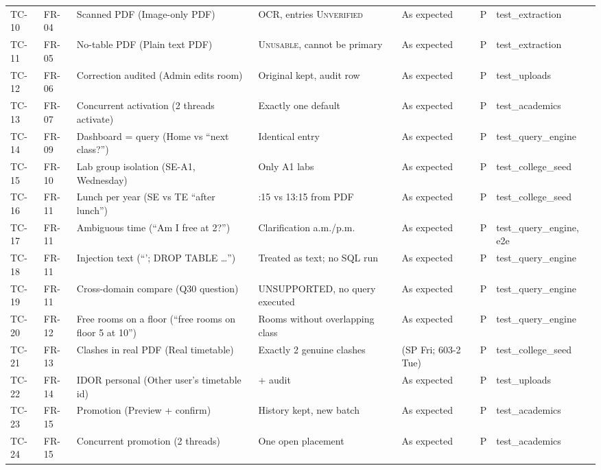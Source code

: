 \begin{longtable}{@{}p{1.15cm}p{1.2cm}>{\raggedright\arraybackslash}p{4.4cm}>{\raggedright\arraybackslash}p{3.6cm}>{\raggedright\arraybackslash}p{2.1cm}p{0.6cm}>{\raggedright\arraybackslash}p{2.3cm}@{}}
TC-10 & FR-04 & Scanned PDF (Image-only PDF) & OCR, entries \textsc{Unverified} & As expected & P & test\_\allowbreak{}extraction\\
TC-11 & FR-05 & No-table PDF (Plain text PDF) & \textsc{Unusable}, cannot be primary & As expected & P & test\_\allowbreak{}extraction\\
TC-12 & FR-06 & Correction audited (Admin edits room) & Original kept, audit row & As expected & P & test\_\allowbreak{}uploads\\
TC-13 & FR-07 & Concurrent activation (2 threads activate) & Exactly one default & As expected & P & test\_\allowbreak{}academics\\
TC-14 & FR-09 & Dashboard = query (Home vs ``next class?'') & Identical entry & As expected & P & test\_\allowbreak{}query\_\allowbreak{}engine\\
TC-15 & FR-10 & Lab group isolation (SE-A1, Wednesday) & Only A1 labs & As expected & P & test\_\allowbreak{}college\_\allowbreak{}seed\\
TC-16 & FR-11 & Lunch per year (SE vs TE ``after lunch'') & 14:15 vs 13:15 from PDF & As expected & P & test\_\allowbreak{}college\_\allowbreak{}seed\\
TC-17 & FR-11 & Ambiguous time (``Am I free at 2?'') & Clarification a.m./p.m. & As expected & P & test\_\allowbreak{}query\_\allowbreak{}engine, e2e\\
TC-18 & FR-11 & Injection text (``'; DROP TABLE \ldots'') & Treated as text; no SQL run & As expected & P & test\_\allowbreak{}query\_\allowbreak{}engine\\
TC-19 & FR-11 & Cross-domain compare (Q30 question) & UNSUPPORTED, no query executed & As expected & P & test\_\allowbreak{}query\_\allowbreak{}engine\\
TC-20 & FR-12 & Free rooms on a floor (``free rooms on floor 5 at 10'') & Rooms without overlapping class & As expected & P & test\_\allowbreak{}query\_\allowbreak{}engine\\
TC-21 & FR-13 & Clashes in real PDF (Real timetable) & Exactly 2 genuine clashes & 2 (SP Fri; 603-2 Tue) & P & test\_\allowbreak{}college\_\allowbreak{}seed\\
TC-22 & FR-14 & IDOR personal (Other user's timetable id) & 404 + audit & As expected & P & test\_\allowbreak{}uploads\\
TC-23 & FR-15 & Promotion (Preview + confirm) & History kept, new batch & As expected & P & test\_\allowbreak{}academics\\
TC-24 & FR-15 & Concurrent promotion (2 threads) & One open placement & As expected & P & test\_\allowbreak{}academics\\

\end{longtable}
